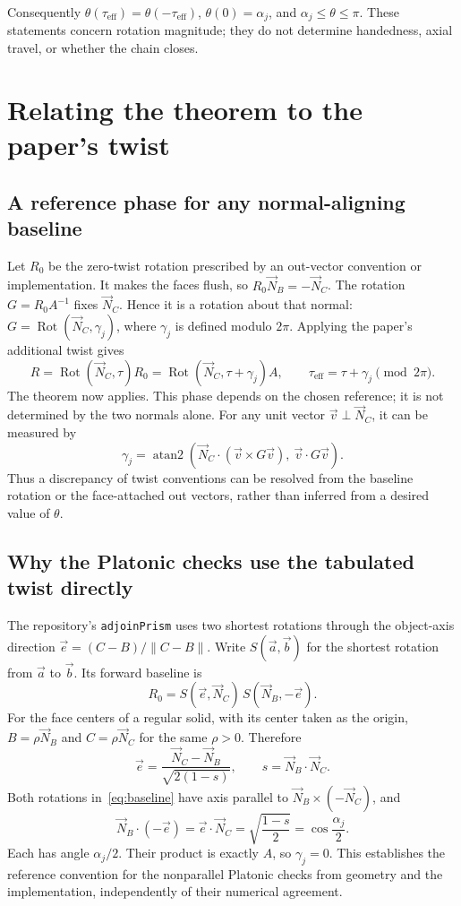 \documentclass[11pt,letterpaper]{article}
\newcommand{\NB}{\vec N_B}
\newcommand{\NC}{\vec N_C}
\newcommand{\Rot}{\operatorname{Rot}}
\newcommand{\eff}{\tau_{\mathrm{eff}}}
\newcommand{\aj}{\alpha_j}
\newcommand{\gj}{\gamma_j}
\newcommand{\ee}{\vec e}
\begin{document}
Consequently $\theta(\eff)=\theta(-\eff)$,
$\theta(0)=\aj$, and $\aj\leq\theta\leq\pi$.
These statements concern rotation magnitude; they do not determine
handedness, axial travel, or whether the chain closes.

\newpage
\section{Relating the theorem to the paper's twist}\label{sec:phase}
\subsection{A reference phase for any normal-aligning baseline}
Let $R_0$ be the zero-twist rotation prescribed by an out-vector convention
or implementation. It makes the faces flush, so $R_0\NB=-\NC$.
The rotation $G=R_0A^{-1}$ fixes $\NC$. Hence it is a rotation about that
normal: $G=\Rot(\NC,\gj)$, where $\gj$ is defined modulo $2\pi$.
Applying the paper's additional twist gives
\begin{equation}\label{eq:phase}
  R=\Rot(\NC,\tau)R_0
   =\Rot(\NC,\tau+\gj)A,\qquad
  \boxed{\eff=\tau+\gj\pmod{2\pi}.}
\end{equation}
The theorem now applies. This phase depends on the chosen reference;
it is not determined by the two normals alone. For any unit vector
$\vec v\perp\NC$, it can be measured by
\[
  \gj=\operatorname{atan2}\!\left(
   \NC\cdot(\vec v\times G\vec v),\ \vec v\cdot G\vec v\right).
\]
Thus a discrepancy of twist conventions can be resolved from the baseline
rotation or the face-attached out vectors, rather than inferred from a
desired value of $\theta$.

\subsection{Why the Platonic checks use the tabulated twist directly}
The repository's \texttt{adjoinPrism} uses two shortest rotations through the
object-axis direction $\ee=(C-B)/\|C-B\|$. Write $S(\vec a,\vec b)$ for
the shortest rotation from $\vec a$ to $\vec b$. Its forward baseline is
\begin{equation}\label{eq:baseline}
  R_0=S(\ee,\NC)\,S(\NB,-\ee).
\end{equation}
For the face centers of a regular solid, with its center taken as the origin,
$B=\rho\NB$ and $C=\rho\NC$ for the same $\rho>0$. Therefore
\[
  \ee=\frac{\NC-\NB}{\sqrt{2(1-s)}},\qquad s=\NB\cdot\NC.
\]
Both rotations in~\eqref{eq:baseline} have axis parallel to
$\NB\times(-\NC)$, and
\[
  \NB\cdot(-\ee)=\ee\cdot\NC=\sqrt{\frac{1-s}{2}}
   =\cos\frac{\aj}{2}.
\]
Each has angle $\aj/2$. Their product is exactly $A$, so $\gj=0$.
This establishes the reference convention for the nonparallel Platonic
checks from geometry and the implementation, independently of their
numerical agreement.
\end{document}
